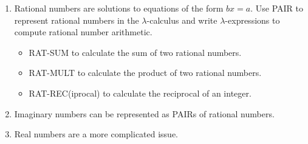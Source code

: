 \documentclass[11pt]{report}
\begin{document}
\begin{enumerate}
\begin{itemize}
			{\bf Solution:}	As we are representing integers as pairs of natural numbers we write an abstraction with the understanding that pairs will be used as input. The following lambda expression constructs the pair representing the sum of two integers. 

				$$\text{INT-SUM}\equiv\lambda m. \ \lambda n. \ \PAIR \ (\SUM \ (\FST \ m) \ (\FST \ n)) \ (\SUM \ (\SND \ m) \ (\SND \ n)) $$


			\item[] INT-MULT to calculate the product of two integers.
			
			{\bf Solution:} If $a-b \equiv (a,b)$ and $(c-d) \equiv (c,d)$, then in order to find the correct expression for multiplication of pairs we can calculate $(a-b)(c-d)$ and collect the positive and negative parts: 
			$$(a-b)(c-d) = (ac + bd) - (ad + bc)$$
			It follows that when integers are represented as pairs of natural numbers we can define integer multiplication as: 
			$$(a,b)(c,d) = (ac + bd, ad + bc)$$
			\begin{align*}
				\text{INT-MULT}\equiv\lambda m. &\ \lambda n. \ \PAIR  \\ 
				&(\SUM \ (\MULT \ (\FST \ m) \ (\FST n)) \ (\MULT \ (\SND \ m) \ (\SND \ n))) \\
				&(\SUM \ (\MULT \ (\FST \ m) \ (\SND n)) \ (\MULT \ (\SND \ m) \ (\FST \ n))) 
			\end{align*}

			\item[] INT-NEG(ative) to calculate the negative of an integer.
			
			{\bf Solution:} $$\text{INT-NEG} \equiv \lambda m. \ \PAIR \ (\SND \ m) \ (\FST \ m) $$
		\end{itemize}
	
	\newpage
	\item Rational numbers are solutions to equations of the form $bx = a$. Use PAIR to represent rational numbers in the $\lambda$-calculus and write $\lambda$-expressions to compute rational number arithmetic. 
		\begin{itemize}
			\item[] RAT-SUM to calculate the sum of two rational numbers.
			\item[] RAT-MULT to calculate the product of two rational numbers.
			\item[] RAT-REC(iprocal) to calculate the reciprocal of an integer.
		\end{itemize}

	\item Imaginary numbers can be represented as PAIRs of rational numbers.
	
	\item Real numbers are a more complicated issue.

\end{enumerate}
	
\end{document}
